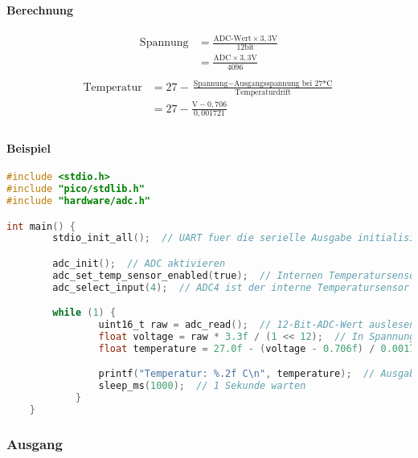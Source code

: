 \documentclass[a4paper,12pt,twoside]{article}
\begin{document}
\paragraph{Berechnung}
\begin{align}
	\text{Spannung} & = \frac{\text{ADC-Wert}\times 3,3\text{V}}{\text{12bit}} \\
	                & = \frac{\text{ADC}\times 3,3\text{V}}{4096}              \\
\end{align}
\begin{align}
	\text{Temperatur} & = {27} - \frac{\text{Spannung}- \text{Ausgangsspannung bei 27*C}}{ \text{Temperaturdrift} } \\
	                  & = {27} - \frac{\text{V}- 0,706}{0,001721}                                                   \\
\end{align}
\paragraph{Beispiel}
\begin{center}
	\begin{minipage}{1.0\textwidth}
		\begin{lstlisting}[language=C]
#include <stdio.h>
#include "pico/stdlib.h"
#include "hardware/adc.h"

int main() {
		stdio_init_all();  // UART fuer die serielle Ausgabe initialisieren

		adc_init();  // ADC aktivieren
		adc_set_temp_sensor_enabled(true);  // Internen Temperatursensor aktivieren
		adc_select_input(4);  // ADC4 ist der interne Temperatursensor

		while (1) {
				uint16_t raw = adc_read();  // 12-Bit-ADC-Wert auslesen (0 bis 4095)
				float voltage = raw * 3.3f / (1 << 12);  // In Spannung umwandeln
				float temperature = 27.0f - (voltage - 0.706f) / 0.001721f;  // Temperatur berechnen

				printf("Temperatur: %.2f C\n", temperature);  // Ausgabe ueber UART
				sleep_ms(1000);  // 1 Sekunde warten
			}
	}
\end{lstlisting}
	\end{minipage}
\end{center}
\subsubsection{Ausgang}
\end{document}
